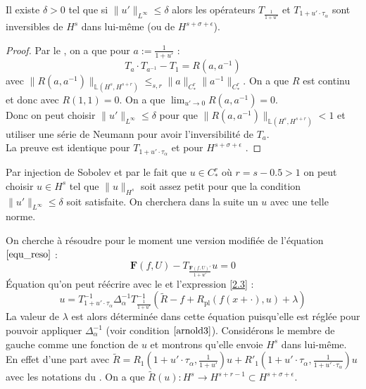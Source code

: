 \documentclass[11pt,a4paper]{article}
\begin{document}
\begin{lemma}\label{inversibilite} 
Il existe $\delta>0$ tel que si $\|u'\|_{L^\infty} \leq \delta $ alors les opérateurs $T_{\frac{1}{1+u'}}$ et $T_{1+u'\cdot \tau_\alpha}$ sont inversibles de $H^s$ dans lui-même (ou de $ H^{s+\sigma+\epsilon}$).
\end{lemma}
\begin{proof}
Par le , on a que pour $a:=\frac{1}{1+u'}$ :
\begin{equation*}
T_a\cdot T_{a^{-1}} -T_1=R(a,a^{-1})
\end{equation*}
avec $\|R(a,a^{-1})\|_{\mathbb{L}(H^s,H^{s+r})} \leq_{s,r} \|a\|_{C^r_*} \|a^{-1}\|_{C^r_*}$. On a que $R$ est continu et donc avec $ R(1,1)=0$. On a que $\lim_{u' \to 0} R(a,a^{-1})=0$. \\
Donc on peut choisir  $\|u'\|_{L^\infty} \leq \delta $  pour que $\|R(a,a^{-1})\|_{\mathbb{L}(H^s,H^{s+r})}<1 $ et utiliser une série de Neumann pour avoir l'inversibilité de $T_a$. \\
La preuve est identique pour $T_{1+u'\cdot \tau_\alpha }$ et pour $ H^{s+\sigma +\epsilon}$ . 
\end{proof}
\begin{rmq}
Par injection de Sobolev et par le fait que $u \in C^r_*$ où $r=s-0.5>1$ on peut choisir  $u \in H^s$ tel que $\|u\|_{H^s}$ soit assez petit pour que la condition $\|u'\|_{L^\infty} \leq \delta $ soit satisfaite. On cherchera dans la suite un $u$ avec une telle norme.
\end{rmq}
On cherche à résoudre pour le moment une version modifiée de l'équation $\eqref{equ_reso}$ :
\begin{equation}\label{equ_reso2}
\mathbf{F}(f,U)-T_{\frac{\mathbf{F}(f,U)'}{1+u'}}u=0
\end{equation}
Équation qu'on peut réécrire avec le  et l'expression \eqref{2.3} :
\begin{equation}\label{equ_reso3}
u=T_{1+u' \cdot \tau_\alpha}^{-1} \Delta_\alpha^{-1} T_{\frac{1}{1+u'}}^{-1}(\tilde{R} -f +R_{\text{pl}}(f(x+\cdot),u) + \lambda)
\end{equation}
La valeur de $\lambda$ est alors déterminée dans cette équation puisqu'elle est réglée pour pouvoir appliquer $\Delta_\alpha^{-1}$ (voir condition $\eqref{arnold3}$).
Considérons le membre de gauche comme une fonction de $u$ et montrons qu'elle envoie $H^s$ dans lui-même.
En effet d'une part avec $\tilde{R}=R_1(1+u'\cdot \tau_\alpha,\frac{1}{1+u'})u +R'_1 ( 1+u' \cdot \tau_\alpha ,\frac{1}{1+u' \cdot \tau_\alpha})u$ avec les notations du . On a que $\tilde{R}(u) : H^s \to H^{s+r-1} \subset H^{s+\sigma +\epsilon}$. \\
\end{document}
